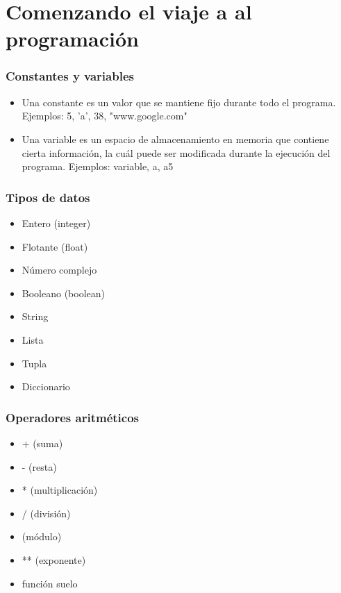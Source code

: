 \documentclass[hyperref={pdfpagelabels=false},xcolor=pst,pdf,fragile]{beamer}
\author{
  Luis, FirstName1
  \texttt{luis.last1@gmail.com}
  \and
  \\Carlos Rodríguez
  \texttt{carlosrdz.isd@gmail.com}
}
\title{\Title}
\date{\today}
\begin{document}
\maketitle



\section{Comenzando el viaje a al programación}
\begin{frame}
    \frametitle{Constantes y variables}
    \pause
    \begin{itemize}
    \item Una constante es un valor que se mantiene fijo durante todo el programa. 
    Ejemplos: 5, 'a', 38, "www.google.com"
    \item Una variable es un espacio de almacenamiento en memoria que contiene cierta información, la cuál puede ser modificada durante la ejecución del programa.
    Ejemplos: variable, a, a5
    \end{itemize}
\end{frame}

\begin{frame}
    \frametitle{Tipos de datos}
    \pause
    \begin{itemize}
    \item Entero (integer)
    \item Flotante (float)
    \item Número complejo
    \item Booleano (boolean)
    \item String
    \item Lista
    \item Tupla
    \item Diccionario
    \end{itemize}
\end{frame}

\begin{frame}
    \frametitle{Operadores aritméticos}
    \pause
    \begin{itemize}
    \item + (suma)
    \item - (resta)
    \item * (multiplicación)
    \item / (división)
    \item (módulo)
    \item ** (exponente)
    \item función suelo
    \end{itemize}
\end{frame}
\end{document}
